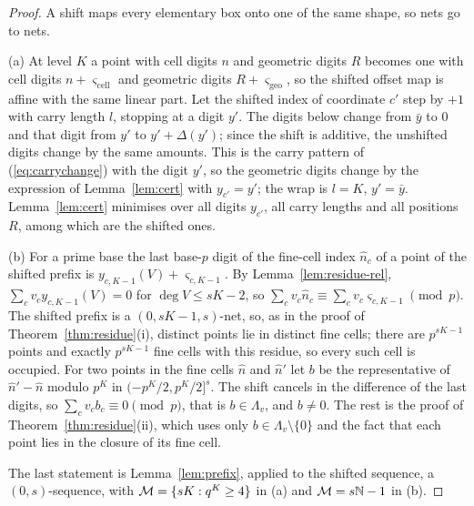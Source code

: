 \begin{proof}
A shift maps every elementary box onto one of the same shape, so nets go to nets.

(a) At level $K$ a point with cell digits $n$ and geometric digits $R$ becomes one with cell digits $n+\varsigma_{\mathrm{cell}}$ and geometric digits $R+\varsigma_{\mathrm{geo}}$, so the shifted offset map is affine with the same linear part. Let the shifted index of coordinate $c'$ step by $+1$ with carry length $l$, stopping at a digit $y'$. The digits below change from $\bar y$ to $0$ and that digit from $y'$ to $y'+\Delta(y')$; since the shift is additive, the unshifted digits change by the same amounts. This is the carry pattern of (\ref{eq:carrychange}) with the digit $y'$, so the geometric digits change by the expression of Lemma~\ref{lem:cert} with $y_{c'}=y'$; the wrap is $l=K$, $y'=\bar y$. Lemma~\ref{lem:cert} minimises over all digits $y_{c'}$, all carry lengths and all positions $R$, among which are the shifted ones.

(b) For a prime base the last base-$p$ digit of the fine-cell index $\hat n_c$ of a point of the shifted prefix is $y_{c,K-1}(V)+\varsigma_{c,K-1}$. By Lemma~\ref{lem:residue-rel}, $\sum_cv_cy_{c,K-1}(V)=0$ for $\deg V\le sK-2$, so $\sum_cv_c\hat n_c\equiv\sum_cv_c\varsigma_{c,K-1}\pmod p$. The shifted prefix is a $(0,sK-1,s)$-net, so, as in the proof of Theorem~\ref{thm:residue}(i), distinct points lie in distinct fine cells; there are $p^{sK-1}$ points and exactly $p^{sK-1}$ fine cells with this residue, so every such cell is occupied. For two points in the fine cells $\hat n$ and $\hat n'$ let $b$ be the representative of $\hat n'-\hat n$ modulo $p^K$ in $(-p^K/2,p^K/2]^s$. The shift cancels in the difference of the last digits, so $\sum_cv_cb_c\equiv0\pmod p$, that is $b\in\Lambda_v$, and $b\ne0$. The rest is the proof of Theorem~\ref{thm:residue}(ii), which uses only $b\in\Lambda_v\setminus\{0\}$ and the fact that each point lies in the closure of its fine cell.

The last statement is Lemma~\ref{lem:prefix}, applied to the shifted sequence, a $(0,s)$-sequence, with $\mathcal{M}=\{sK:q^K\ge4\}$ in (a) and $\mathcal{M}=s\mathbb{N}-1$ in (b).
\end{proof}

